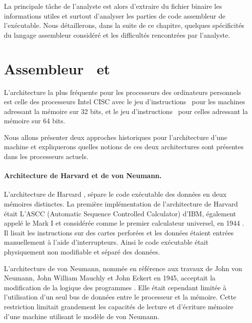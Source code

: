 La principale tâche de l'analyste est alors d'extraire du fichier binaire les informations utiles et surtout d'analyser les parties de code assembleur de l'exécutable. Nous détaillerons, dans la suite de ce chapitre, quelques spécificités du langage assembleur considéré et les difficultés rencontrées par l'analyste.

\label{section:assembleur}
\section{Assembleur \xq\ et \xs}
L'architecture la plus fréquente pour les processeurs des ordinateurs personnels est celle des processeurs Intel CISC avec le jeu d'instructions \xq\ pour les machines adressant la mémoire sur 32 bits, et le jeu d'instructions \xs\ pour celles adressant la mémoire sur 64 bits.

Nous allons présenter deux approches historiques pour l'architecture d'une machine et expliquerons quelles notions de ces deux architectures sont présentes dans les processeurs actuels.

\paragraph{Architecture de Harvard et de von Neumann.}
L'architecture de Harvard \cite{ibm_mark1}, sépare le code exécutable des données en deux mémoires distinctes.
La première implémentation de l'architecture de Harvard était L’ASCC (Automatic Sequence Controlled Calculator) d'IBM, également appelé le Mark I et considérée comme le premier calculateur universel, en 1944 . 
Il lisait les instructions sur des cartes perforées et les données étaient entrées manuellement à l'aide d'interrupteurs. 
Ainsi le code exécutable était physiquement non modifiable et séparé des données. 

L'architecture de von Neumann, nommée en référence aux travaux de John von Neumann, John William Mauchly et John Eckert en 1945, acceptait la modification de la logique des programmes \cite{timsit}.
Elle était cependant limitée à l'utilisation d'un seul bus de données entre le processeur et la mémoire.
Cette restriction limitait grandement les capacités de lecture et d'écriture mémoire d'une machine utilisant le modèle de von Neumann.

